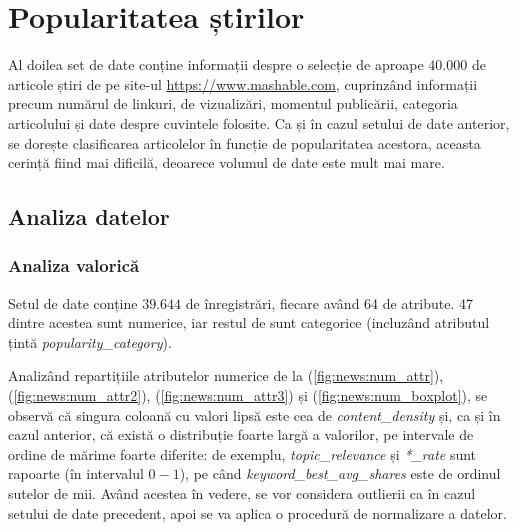 \documentclass{article}
\begin{document}
\section{Popularitatea știrilor}
Al doilea set de date conține informații despre o selecție de aproape $40.000$ 
de articole știri de pe site-ul \url{https://www.mashable.com}, cuprinzând 
informații precum numărul de linkuri, de vizualizări, momentul publicării, 
categoria articolului și date despre cuvintele folosite. Ca și în cazul
setului de date anterior, se dorește clasificarea articolelor în funcție de
popularitatea acestora, aceasta cerință fiind mai dificilă, deoarece volumul de
date este mult mai mare.

\subsection{Analiza datelor}
\subsubsection{Analiza valorică}
Setul de date conține $39.644$ de înregistrări, fiecare având 64 de atribute. 47
dintre acestea sunt numerice, iar restul de sunt categorice (incluzând atributul
țintă \textit{popularity\_category}).

Analizând repartițiile atributelor numerice de la (\ref{fig:news:num_attr}),
(\ref{fig:news:num_attr2}), (\ref{fig:news:num_attr3}) și 
(\ref{fig:news:num_boxplot}), se observă că singura coloană cu valori lipsă 
este cea de \textit{content\_density} și, ca și în cazul anterior, că există
o distribuție foarte largă a valorilor, pe intervale de ordine de mărime foarte 
diferite: de exemplu, \textit{topic\_relevance} și \textit{*\_rate} sunt 
rapoarte (în intervalul $0-1$), pe când \textit{keyword\_best\_avg\_shares} este
de ordinul sutelor de mii. Având acestea în vedere, se vor considera outlierii 
ca în cazul setului de date precedent, apoi se va aplica o procedură de 
normalizare a datelor.
\end{document}
